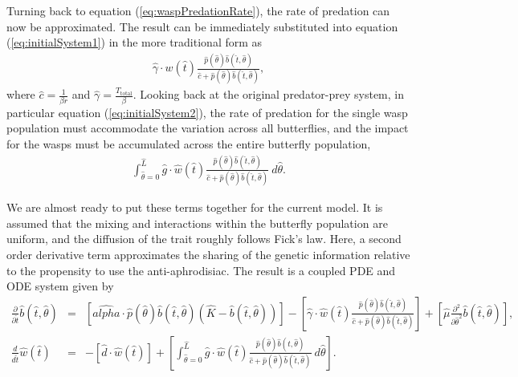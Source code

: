 \documentclass[review]{elsarticle}
\def\alpha{alpha}%
\newcommand{\origB}{\hat{b}}
\newcommand{\origW}{\hat{w}}
\newcommand{\origAlpha}{\hat{\alpha}}
\newcommand{\origK}{\hat{K}}
\newcommand{\origGamma}{\hat{\gamma}}
\newcommand{\origC}{\hat{c}}
\newcommand{\origD}{\hat{d}}
\newcommand{\origG}{\hat{g}}
\newcommand{\origL}{\hat{L}}
\newcommand{\origP}[1]{\hat{p}(#1)}
\newcommand{\origTheta}{\hat{\theta}}
\newcommand{\origT}{\hat{t}}
\newcommand{\origMu}{\hat{\mu}}
\begin{document}
Turning back to equation (\ref{eq:waspPredationRate}), the rate of
predation can now be approximated.  The result can be immediately
substituted into equation (\ref{eq:initialSystem1}) in the more
traditional form as
\begin{eqnarray}
  \label{eq:butterflyPredationRate}
  \origGamma \cdot w(\origT) \frac{\origP{\origTheta} \origB(\origT,\origTheta) }{\origC +  \origP{\origTheta} \origB(\origT,\origTheta)},
\end{eqnarray}
where $\origC=\frac{1}{\beta r}$ and
$\origGamma=\frac{T_{\mathrm{total}}}{\beta}$.  Looking back at the
original predator-prey system, in particular equation
(\ref{eq:initialSystem2}), the rate of predation for the single wasp
population must accommodate the variation across all butterflies, and
the impact for the wasps must be accumulated across the entire
butterfly population,
\begin{eqnarray}
  \label{eq:totalWaspPredationRate}
  \int^{\origL}_{\origTheta=0} \origG \cdot \origW(\origT) \frac{\origP{\origTheta} \origB(\origT,\origTheta) }{\origC + \origP{\origTheta} \origB(\origT,\origTheta)} ~ d\origTheta.
\end{eqnarray}

We are almost ready to put these terms together for the current
model. It is assumed that the mixing and interactions within the
butterfly population are uniform, and the diffusion of the trait
roughly follows Fick's law\cite{logan2006applied}. Here, a second
order derivative term approximates the sharing of the genetic
information relative to the propensity to use the
anti-aphrodisiac. The result is a coupled PDE and ODE system given by
\begin{eqnarray}
  \label{eq:odePDE1}
  \frac{\partial}{\partial \origT} \origB(\origT,\origTheta) & = &
      \left[ \origAlpha \cdot \origP{\origTheta} \origB(\origT,\origTheta) (\origK - \origB(\origT,\origTheta)) \right]
      - \left[ \origGamma \cdot \origW(\origT) \frac{\origP{\origTheta} \origB(\origT,\origTheta)}{\origC+\origP{\origTheta}\origB(\origT,\origTheta)} \right]
      + \left[ \origMu \frac{\partial^2}{\partial \origTheta^2} \origB(\origT,\origTheta)\right], \\
  \label{eq:odePDE2}
  \frac{d}{d\origT} \origW(\origT) & = & - \left[ \origD \cdot \origW(\origT) \right]  +
       \left[
          \int^{\origL}_{\origTheta=0} \origG \cdot \origW(\origT) \frac{\origP{\origTheta} \origB(\origT,\origTheta) }{\origC + \origP{\origTheta} \origB(\origT,\origTheta)} ~ d\origTheta
       \right].
\end{eqnarray}
\end{document}
